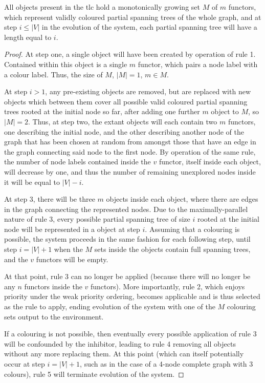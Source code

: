\begin{proposition}\label{prop:gcol:grow}
All \bo{} objects present in the \gls{tlc} hold a monotonically growing set \(M\) of \(m\) functors, which represent validly coloured partial spanning trees of the whole graph, and at step \(i \leq |V|\) in the evolution of the system, each partial spanning tree will have a length equal to \(i\).
\end{proposition}

\begin{proof}
At step one, a single \bo{} object will have been created by operation of rule 1.  Contained within this \bo{} object is a single \(m\) functor, which pairs a node label with a colour label.  Thus, the size of \(M\), \(|M|=1\), \(m \in M\).

At step \(i > 1\), any pre-existing \bo{} objects are removed, but are replaced with new \bo{} objects which between them cover all possible valid coloured partial spanning trees rooted at the initial node so far, after adding one further \(m\) object to \(M\), so \(|M|=2\).  Thus, at step two, the extant \bo{} objects will each contain two \(m\) functors, one describing the initial node, and the other describing another node of the graph that has been chosen at random from amongst those that have an edge in the graph connecting said node to the first node.  By operation of the same rule, the number of node labels contained inside the \(v\) functor, itself inside each \bo{} object, will decrease by one, and thus the number of remaining unexplored nodes inside it will be equal to \(|V| - i\).

At step 3, there will be three \(m\) objects inside each \bo{} object, where there are edges in the graph connecting the represented nodes.  Due to the maximally-parallel nature of rule 3, every possible partial spanning tree of size \(i\) rooted at the initial node will be represented in a \bo{} object at step \(i\).  Assuming that a colouring is possible, the system proceeds in the same fashion for each following step, until step \(i = |V| + 1\) when the \(M\) sets inside the \bo{} objects contain full spanning trees, and the \(v\) functors will be empty.

At that point, rule 3 can no longer be applied (because there will no longer be any \(n\) functors inside the \(v\) functors).  More importantly, rule 2, which enjoys priority under the weak priority ordering, becomes applicable and is thus selected as the rule to apply, ending evolution of the system with one of the \(M\) colouring sets output to the environment.

If a colouring is not possible, then eventually every possible application of rule 3 will be confounded by the inhibitor, leading to rule 4 removing all \bo{} objects without any more replacing them.  At this point (which can itself potentially occur at step \(i = |V| + 1\), such as in the case of a 4-node complete graph with 3 colours), rule 5 will terminate evolution of the system.
\end{proof}

